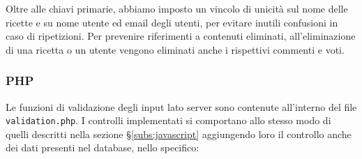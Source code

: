 Oltre alle chiavi primarie, abbiamo imposto un vincolo di unicità sul nome delle ricette e su nome utente ed email degli utenti, per evitare inutili confusioni in caso di ripetizioni.
Per prevenire riferimenti a contenuti eliminati, all'eliminazione di una ricetta o un utente vengono eliminati anche i rispettivi commenti e voti.

\subsubsection{PHP}\label{subs:php}
Le funzioni di validazione degli input lato server sono contenute all'interno del file \texttt{validation.php}. I controlli implementati si comportano allo stesso modo di quelli descritti nella sezione \S\ref{subs:javascript} aggiungendo loro il controllo anche dei dati presenti nel database, nello specifico:
